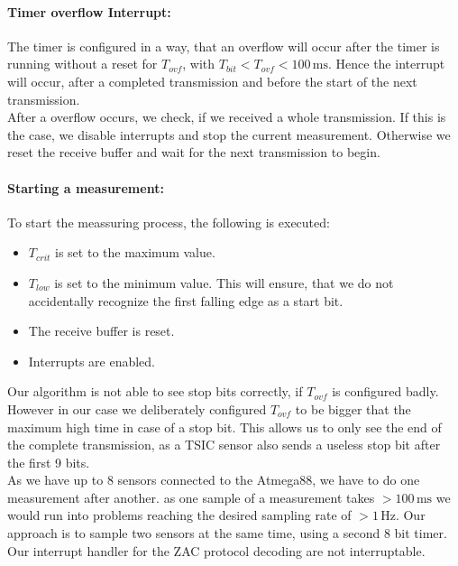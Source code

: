 \documentclass[a4paper]{scrreprt}
\begin{document}
\paragraph{Timer overflow Interrupt:} The timer is configured in a way, that an overflow will occur after
the timer is running without a reset for $T_{ovf}$, with $T_{bit} < T_{ovf} < 100\,\mathrm{ms}$. Hence
the interrupt will occur, after a completed transmission and before the start of the next transmission.\\
After a overflow occurs, we check, if we received a whole transmission. If this is the case, we disable
interrupts and stop the current measurement. Otherwise we reset the receive buffer and wait for the
next transmission to begin.
\paragraph{Starting a measurement:} To start the meassuring process, the following is executed:
\begin{itemize}
	\item $T_{crit}$ is set to the maximum value.
	\item $T_{low}$ is set to the minimum value. This will ensure, that we do not
		accidentally recognize the first falling edge as a start bit.
	\item The receive buffer is reset.
	\item Interrupts are enabled.
\end{itemize}
Our algorithm is not able to see stop bits correctly, if $T_{ovf}$ is configured badly.
However in our case we deliberately configured $T_{ovf}$ to be bigger that the maximum
high time in case of a stop bit.
This allows us to only see the end of the complete transmission, as a TSIC sensor also
sends a useless stop bit after the first 9 bits.\\
As we have up to 8 sensors connected to the Atmega88, we have to do one measurement
after another. as one sample of a measurement takes $>100\,\mathrm{ms}$ we would run
into problems reaching the desired sampling rate of $>1\,\mathrm{Hz}$.
Our approach is to sample two sensors at the
same time, using a second 8 bit timer. Our interrupt handler for the ZAC protocol decoding are not interruptable.
\end{document}

